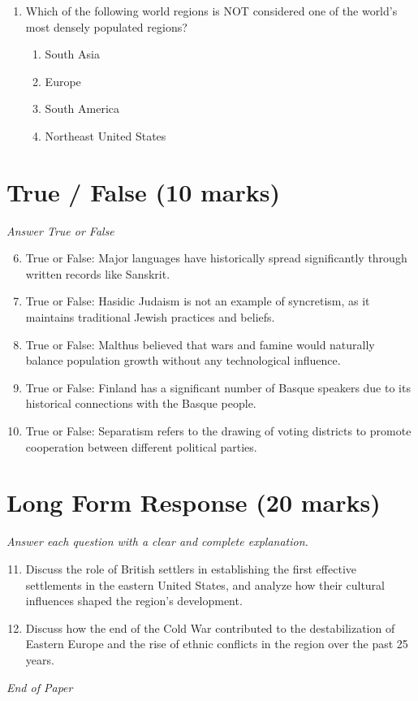\documentclass[12pt]{article}
\begin{document}
\begin{enumerate}[label=\arabic*.]
\begin{enumerate}[label=(\alph*)]
    \item World cities are found only in the northern and western hemispheres.
\end{enumerate}
\item Which of the following world regions is NOT considered one of the world's most densely populated regions?
\begin{enumerate}[label=(\alph*)]
    \item South Asia
    \item Europe
    \item South America
    \item Northeast United States
\end{enumerate}
\end{enumerate}

\section*{True / False (10 marks)}
\textit{Answer True or False}
\begin{enumerate}[label=\arabic*.]
\setcounter{enumi}{5}
\item True or False: Major languages have historically spread significantly through written records like Sanskrit.
\item True or False: Hasidic Judaism is not an example of syncretism, as it maintains traditional Jewish practices and beliefs.
\item True or False: Malthus believed that wars and famine would naturally balance population growth without any technological influence.
\item True or False: Finland has a significant number of Basque speakers due to its historical connections with the Basque people.
\item True or False: Separatism refers to the drawing of voting districts to promote cooperation between different political parties.
\end{enumerate}

\section*{Long Form Response (20 marks)}
\textit{Answer each question with a clear and complete explanation.}
\begin{enumerate}[label=\arabic*.]
\setcounter{enumi}{10}
\item Discuss the role of British settlers in establishing the first effective settlements in the eastern United States, and analyze how their cultural influences shaped the region's development.
\item Discuss how the end of the Cold War contributed to the destabilization of Eastern Europe and the rise of ethnic conflicts in the region over the past 25 years.
\end{enumerate}

\vfill
\noindent\textit{End of Paper}
\end{document}
